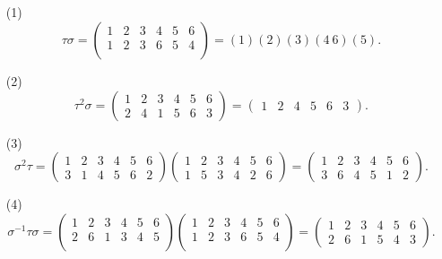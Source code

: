 \documentclass[UTF8]{ctexart}
\begin{document}
\subsection{}   %
\begin{enumerate}
    \item [(1)]
    \[
        \tau \sigma 
        = 
        \begin{pmatrix}
            1 & 2 & 3 & 4 & 5 & 6\\
            1 & 2 & 3 & 6 & 5 & 4\\
        \end{pmatrix}  
        = 
        (1)(2)(3)(4\ 6)(5).
    \]
    \item [(2)]
    \[
        \tau ^2 \sigma 
        = 
        \begin{pmatrix}
            1 & 2 & 3 & 4 & 5 & 6\\
            2 & 4 & 1 & 5 & 6 & 3
        \end{pmatrix}  
        =
        \begin{pmatrix}
            1 & 2 & 4 & 5 & 6 & 3
        \end{pmatrix} .
    \]
    \item [(3)]
    \[
        \sigma ^2 \tau  
        = 
        \begin{pmatrix}
            1 & 2 & 3 & 4 & 5 & 6\\
            3 & 1 & 4 & 5 & 6 & 2
        \end{pmatrix}
        \begin{pmatrix}
            1 & 2 & 3 & 4 & 5 & 6\\
            1 & 5 & 3 & 4 & 2 & 6
        \end{pmatrix}
        =
        \begin{pmatrix}
            1 & 2 & 3 & 4 & 5 & 6\\
            3 & 6 & 4 & 5 & 1 & 2
        \end{pmatrix}.
    \]
    \item [(4)]
    \[
        \sigma ^{-1} \tau \sigma 
        = 
        \begin{pmatrix}
            1 & 2 & 3 & 4 & 5 & 6\\
            2 & 6 & 1 & 3 & 4 & 5\\
        \end{pmatrix} 
        \begin{pmatrix}
            1 & 2 & 3 & 4 & 5 & 6\\
            1 & 2 & 3 & 6 & 5 & 4\\
        \end{pmatrix}  
        =
        \begin{pmatrix}
            1 & 2 & 3 & 4 & 5 & 6\\
            2 & 6 & 1 & 5 & 4 & 3
        \end{pmatrix}.
    \]
\end{enumerate}
\end{document}

